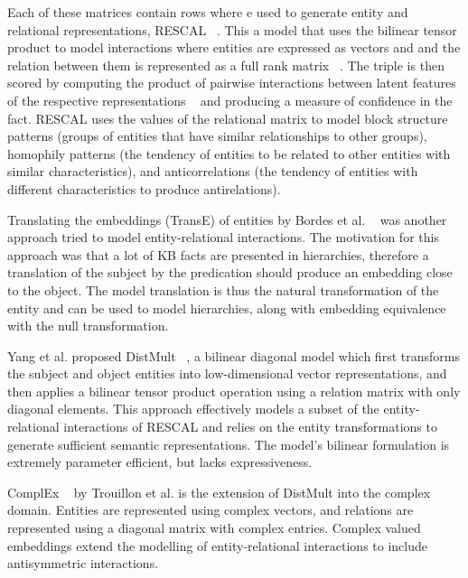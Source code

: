 \noindent Each of these matrices contain rows where e used to generate entity and relational representations, RESCAL \unskip~\citep{nickel2011three}. This a model that uses the bilinear tensor product to model interactions where entities are expressed as vectors and and the relation between them is represented as a full rank matrix \unskip~\citep{nickel2012factorizing}. The triple is then scored by computing the product of pairwise interactions between latent features of the respective representations \unskip~\citep{nickel2015review} and producing a measure of confidence in the fact. RESCAL uses the values of the relational matrix to model block structure patterns (groups of entities that have similar relationships to other groups), homophily patterns (the tendency of entities to be related to other entities with similar characteristics), and anticorrelations (the tendency of entities with different characteristics to produce antirelations). \par

\noindent Translating the embeddings (TransE) of entities by Bordes et al. \unskip~\citep{bordes2013translating} was another approach tried to model entity-relational interactions. The motivation for this approach was that a lot of KB facts are presented in hierarchies, therefore a translation of the subject by the predication should produce an embedding close to the object. The model translation is thus the natural transformation of the entity and can be used to model hierarchies, along with embedding equivalence with the null transformation. \par

\noindent Yang et al. proposed DistMult \unskip~\citep{yang2014embedding}, a bilinear diagonal model which first transforms the subject and object entities into low-dimensional vector representations, and then applies a bilinear tensor product operation using a relation matrix with only diagonal elements. This approach effectively models a subset of the entity-relational interactions of RESCAL and relies on the entity transformations to generate sufficient semantic representations. The model's bilinear formulation is extremely parameter efficient, but lacks expressiveness. \par

\noindent ComplEx \unskip~\citep{trouillon2016complex} by Trouillon et al. is the extension of DistMult into the complex domain. Entities are represented using complex vectors, and relations are represented using a diagonal matrix with complex entries. Complex valued embeddings extend the modelling of entity-relational interactions to include antisymmetric interactions. \par

